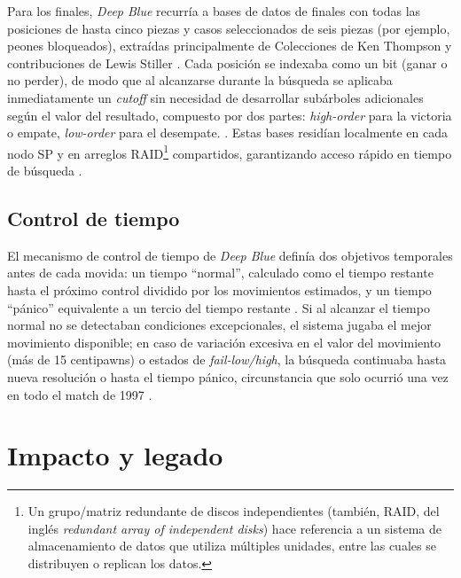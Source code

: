 \documentclass[a4paper, 12pt]{article}
\begin{document}
Para los finales, \textit{Deep Blue} recurría a bases de datos 
de finales con todas las posiciones de hasta cinco piezas y 
casos seleccionados de seis piezas (por ejemplo, peones 
bloqueados), extraídas principalmente de Colecciones de Ken 
Thompson \cite{thompson1986retrograde} y contribuciones de Lewis Stiller \cite{campbell2002deep}. 
Cada posición se indexaba como un bit (ganar o no perder), de 
modo que al alcanzarse durante la búsqueda se aplicaba 
inmediatamente un \emph{cutoff} sin necesidad de desarrollar subárboles 
adicionales según el valor del resultado, 
compuesto por dos partes: 
\emph{high-order} para la victoria o empate, \emph{low-order} 
para el desempate. \cite{campbell2002deep}. Estas bases residían localmente 
en cada nodo SP y en arreglos RAID\footnote{Un grupo/matriz redundante de discos independientes (también, RAID, del inglés \emph{redundant array of independent disks}) 
hace referencia a un sistema de almacenamiento de datos que 
utiliza múltiples unidades, entre las cuales se distribuyen o 
replican los datos.} compartidos, garantizando 
acceso rápido en tiempo de búsqueda \cite{campbell2002deep}.

\subsection{Control de tiempo}

El mecanismo de control de tiempo de \textit{Deep Blue} definía 
dos objetivos temporales antes de cada movida: un tiempo 
“normal”, calculado como el tiempo restante hasta el próximo 
control dividido por los movimientos estimados, y un tiempo 
“pánico” equivalente a un tercio del tiempo restante 
\cite{campbell2002deep}. Si al alcanzar el tiempo normal no se 
detectaban condiciones excepcionales, el sistema jugaba el mejor 
movimiento disponible; en caso de variación excesiva en el valor 
del movimiento (más de 15 centipawns) o estados de 
\emph{fail-low/high}, la búsqueda continuaba hasta nueva 
resolución o hasta el tiempo pánico, circunstancia que solo 
ocurrió una vez en todo el match de 1997 \cite{campbell2002deep}.













\section{Impacto y legado}
\end{document}
